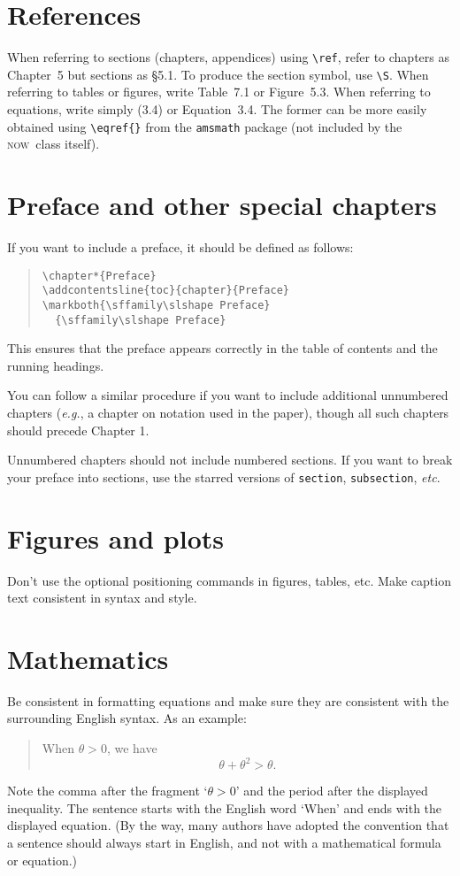 \documentclass[openany]{now} %
\newcommand{\eg}{\emph{e.g.}}
\newcommand{\etc}{\emph{etc}}
\newcommand{\now}{\textsc{now}}
\begin{document}
\section{References}

When referring to sections (chapters, appendices)
using \texttt{\textbackslash ref}, refer to chapters
as Chapter~5 but sections as \S5.1. To produce the section symbol, use
\texttt{\textbackslash S}.  When referring to tables or figures, write
Table~7.1 or Figure~5.3. When referring to equations, write simply (3.4) or
Equation~3.4. The former can be more easily obtained using
\texttt{\textbackslash eqref\{\}} from the \texttt{amsmath} package (not
included by the \now\ class itself).

\section{Preface and other special chapters}

If you want to include a preface, it should be defined as follows:
\begin{quote}
\begin{verbatim}
\chapter*{Preface}
\addcontentsline{toc}{chapter}{Preface}
\markboth{\sffamily\slshape Preface}
  {\sffamily\slshape Preface}
\end{verbatim}
\end{quote}
This ensures that the preface appears correctly in the table of contents
and the running headings.

You can follow a similar procedure if you want to include additional
unnumbered chapters (\eg, a chapter on notation used in the paper),
though all such chapters should precede Chapter 1.

Unnumbered chapters should not include numbered sections. If you want
to break your preface into sections, use the starred versions of
\texttt{section}, \texttt{subsection}, \etc.

\section{Figures and plots}

Don't use the optional positioning commands in figures, tables, etc.
Make caption text consistent in syntax and style.

\section{Mathematics}
Be consistent in formatting equations and make sure they are consistent 
with the surrounding English syntax.
As an example: 
\begin{quote}
When $\theta >0$, we have
\[
\theta + \theta^2 > \theta.
\]
\end{quote}
Note the comma after the fragment `$\theta>0$' and the period after the displayed
inequality. The sentence starts with the English word `When' and ends with 
the displayed equation.
(By the way, many authors have adopted the convention that a 
sentence should always start in English, and not with a mathematical 
formula or equation.)
\end{document}
